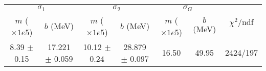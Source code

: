 \begin{tabular}{cc|cc|cc||c}
\multicolumn{2}{c|}{$\sigma_1$} & \multicolumn{2}{|c}{$\sigma_2$} & \multicolumn{2}{|c}{$\sigma_G$}  & \multirow{2}{*}{$\chi^2/$ndf}\\
$m$ ($\times1e5$) & $b$ (MeV) & $m$ ($\times1e5$) & $b$ (MeV) & $m$ ($\times1e5$) & $b$ (MeV) & \\
\hline
8.39 $\pm$ 0.15 & 17.221 $\pm$ 0.059 & 10.12 $\pm$ 0.24 & 28.879 $\pm$ 0.097 & 16.50 & 49.95 & 2424/197\\
\end{tabular}
